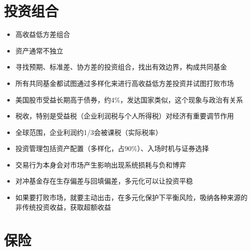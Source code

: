 \documentclass[]{book}
\providecommand{\tightlist}{%
  \setlength{\itemsep}{0pt}\setlength{\parskip}{0pt}}
\begin{document}
\section{投资组合}

\begin{itemize}
\tightlist
\item
  高收益低方差组合
\item
  资产通常不独立
\item
  寻找预期、标准差、协方差的投资组合，找出有效边界，构成共同基金
\item
  所有共同基金都试图通过多样化来进行高收益低方差投资并试图打败市场
\item
  美国股市受益长期高于债券，约4\%，发达国家类似，这个现象与政治有关系
\item
  税收，特别是受益税（企业利润税与个人所得税）对经济有重要调节作用
\item
  全球范围，企业利润约1/3会被课税（实际税率）
\item
  投资管理包括资产配置（多样化，占90\%）、入场时机与证券选择
\item
  交易行为本身会对市场产生影响出现系统损耗与负和博弈
\item
  对冲基金存在生存偏差与回填偏差，多元化可以让投资平稳
\item
  如果要打败市场，就要主动出击，在多元化保护下平衡风险，吸纳各种来源的非传统投资收益，获取超额收益
\end{itemize}

\section{保险}
\end{document}
